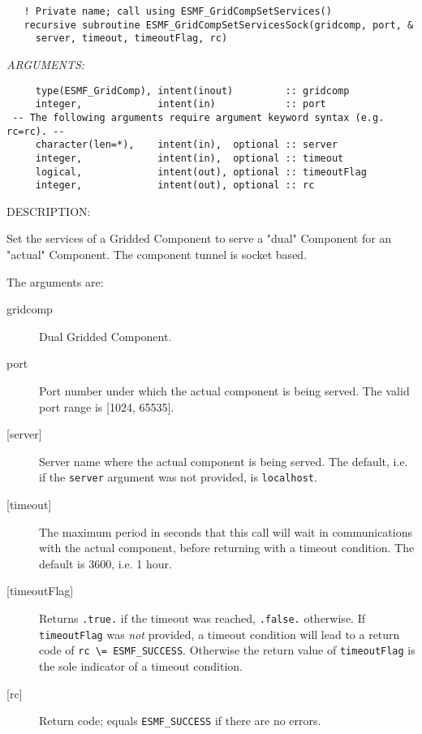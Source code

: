   
\begin{verbatim}   ! Private name; call using ESMF_GridCompSetServices()
   recursive subroutine ESMF_GridCompSetServicesSock(gridcomp, port, &
     server, timeout, timeoutFlag, rc)\end{verbatim}{\em ARGUMENTS:}
\begin{verbatim}     type(ESMF_GridComp), intent(inout)         :: gridcomp
     integer,             intent(in)            :: port
 -- The following arguments require argument keyword syntax (e.g. rc=rc). --
     character(len=*),    intent(in),  optional :: server
     integer,             intent(in),  optional :: timeout
     logical,             intent(out), optional :: timeoutFlag
     integer,             intent(out), optional :: rc\end{verbatim}
{\sf DESCRIPTION:\\ }


   Set the services of a Gridded Component to serve a "dual" Component for an
   "actual" Component. The component tunnel is socket based.
  
   The arguments are:
   \begin{description}
   \item[gridcomp]
     Dual Gridded Component.
   \item[port]
     Port number under which the actual component is being served. The valid
     port range is [1024, 65535].
   \item[{[server]}]
     Server name where the actual component is being served. The default, i.e.
     if the {\tt server} argument was not provided, is {\tt localhost}.
   \item[{[timeout]}]
     The maximum period in seconds that this call will wait in communications
     with the actual component, before returning with a timeout condition.
     The default is 3600, i.e. 1 hour.
   \item[{[timeoutFlag]}]
     Returns {\tt .true.} if the timeout was reached, {\tt .false.} otherwise.
     If {\tt timeoutFlag} was {\em not} provided, a timeout condition will lead
     to a return code of {\tt rc \textbackslash = ESMF\_SUCCESS}. Otherwise the
     return value of {\tt timeoutFlag} is the sole indicator of a timeout
     condition.
   \item[{[rc]}]
     Return code; equals {\tt ESMF\_SUCCESS} if there are no errors.
   \end{description}
   
 
